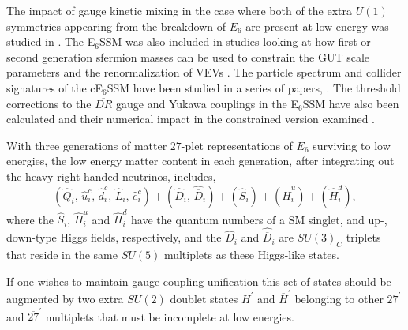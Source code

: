 \documentclass[preprint,amsmath,amssymb,aps,superscriptaddress,prd,
showpacs,floatfix,nofootinbib]{revtex4-1}
\newcommand{\be}{\begin{equation}}
\newcommand{\ee}{\end{equation}}
\begin{document}
The impact of gauge kinetic mixing in the case where both of the extra
$U(1)$ symmetries appearing from the breakdown of $E_6$ are present at
low energy was studied in \cite{Rizzo:2012rf}.  The E$_6$SSM was also
included in studies looking at how first or second generation sfermion
masses can be used to constrain the GUT scale parameters \cite{Miller:2012vn}
and the renormalization of VEVs \cite{Sperling:2013eva, Sperling:2013xqa}.
The particle spectrum and collider signatures of the cE$_6$SSM have been
studied in a series of papers, \cite{Athron:2009ue, Athron:2009bs,
Athron:2011wu,Athron:2012sq}.  The threshold corrections to the
$\overline{DR}$ gauge and Yukawa couplings in the E$_6$SSM have also been
calculated and their numerical impact in the constrained version examined
\cite{Athron:2012pw}.

With three generations of matter $27$-plet representations of $E_6$
surviving to low energies, the low energy matter content in each generation,
after integrating out the heavy right-handed neutrinos, includes, \be
(\hat{Q}_i, \, \hat{u}^c_i, \, \hat{d}^c_i, \, \hat{L}_i, \, \hat{e}^c_i)
+ (\hat{D}_i, \, \hat{\overline{D}}_i) + (\hat{S}_{i}) + (\hat{H}^u_i)
+ (\hat{H}^d_i) ,\ee
where the $\hat{S}_{i}$, $\hat{H}^u_i$ and $\hat{H}^d_i$ have the quantum
numbers of a SM singlet, and up-, down-type Higgs fields, respectively, and
the $\hat{D}_i$ and $\hat{\overline{D}}_i$ are $SU(3)_C$ triplets that reside
in the same $SU(5)$ multiplets as these Higgs-like states.

If one wishes to maintain gauge coupling unification this set of states should
be augmented by two extra $SU(2)$ doublet states $H^\prime$ and
$\overline{H}^\prime$ belonging to other $27^\prime$ and $\overline{27}^\prime$
multiplets that must be incomplete at low energies.
\end{document}

